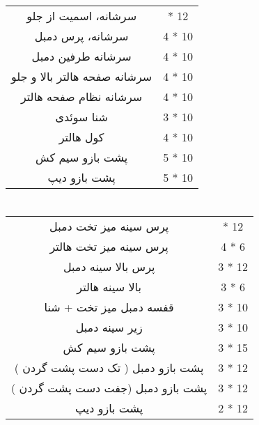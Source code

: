 \documentclass[12pt]{article}
\newcommand\myPadding{1.5}
\begin{document}
\section{}




\begin{center}
  \bgroup
  \def\arraystretch{\myPadding}%
  \begin{tabular}{ c  c  }
سرشانه، اسمیت از جلو &
 { \quad 3 * 12 \quad } \\
سرشانه، پرس دمبل &
 4 * 10 \\
سرشانه طرفین دمبل &
 4 * 10 \\
سرشانه صفحه هالتر بالا و جلو &
 4 * 10 \\
سرشانه نظام صفحه هالتر &
 4 * 10 \\
شنا سوئدی &
 3 * 10 \\
کول هالتر &
 4 * 10 \\
پشت بازو سیم کش &
 5 * 10 \\
پشت بازو دیپ &
 5 * 10 \\
  \end{tabular}
  \egroup
\end{center}



\section{}



\begin{center}
  \bgroup
  \def\arraystretch{\myPadding}%
  \begin{tabular}{ c  c  }
پرس سینه میز تخت دمبل &
 { \quad 4 * 12 \quad } \\
پرس سینه میز تخت هالتر &
 4 * 6 \\
پرس بالا سینه دمبل &
 3 * 12 \\
بالا سینه هالتر &
 3 * 6 \\
قفسه دمبل میز تخت + شنا &
  3 * 10 \\
زیر سینه دمبل &
 3 * 10 \\
پشت بازو سیم کش &
 3 * 15 \\
پشت بازو دمبل ( تک دست پشت گردن ) &
 3 * 12 \\
پشت بازو دمبل (جفت دست پشت گردن ) &
 3 * 12 \\
پشت بازو دیپ &
 2 * 12 \\
  \end{tabular}
  \egroup
\end{center}
\end{document}
